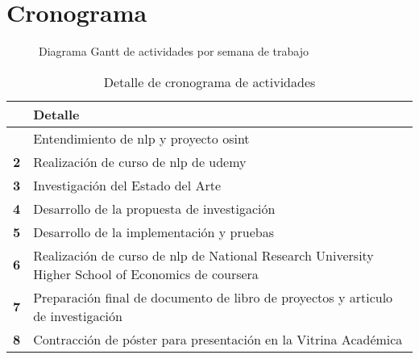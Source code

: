 \chapter{Cronograma} %

\label{ch:Schedule} %


\begin{figure}[h!]
\caption{Diagrama Gantt de actividades por semana de trabajo}
\label{fig:gantt}
\end{figure}

\vspace{1cm}

\begin{table}[h!]
\begin{center}
\begin{tabular}{|>{\centering\arraybackslash}p{}|p{}|} \hline
  & \textbf{Detalle} \\ \hline
  {\bf 1} & Entendimiento de \gls{nlp} y proyecto \gls{osint} \\ \hline
  
  {\bf 2} & Realización de curso de \gls{nlp} de \gls{udemy} \\ \hline
  
  {\bf 3} & Investigación del Estado del Arte \\ \hline
  
  {\bf 4} & Desarrollo de la propuesta de investigación \\ \hline
  
  {\bf 5} & Desarrollo de la implementación y pruebas \\ \hline
  
  {\bf 6} & Realización de curso de \gls{nlp} de National Research University Higher School of Economics
            de \gls{coursera} \\ \hline
  
  {\bf 7} & Preparación final de documento de libro de proyectos y articulo de investigación \\ \hline
  
  {\bf 8} & Contracción de póster para presentación en la Vitrina Académica \\ \hline
\end{tabular}
\end{center}
\caption{Detalle de cronograma de actividades}
\label{table:schedule}
\end{table}